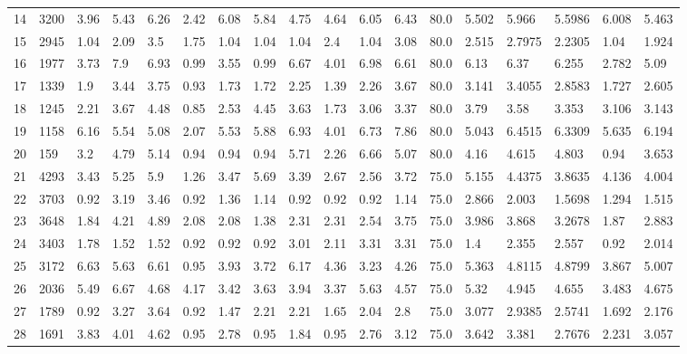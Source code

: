 \documentclass[landscape, 10pt]{report}
\begin{document}
\begin{longtable}{l || l || l | l | l | l | l | l | l | l | l | l | l || l | l | l | l | l}
14 & 3200 & 3.96 & 5.43 & 6.26 & 2.42 & 6.08 & 5.84 & 4.75 & 4.64 & 6.05 & 6.43 & 80.0 & 5.502 & 5.966 & 5.5986 & 6.008 & 5.463\\ 
\rowcolor{lightgray}15 & 2945 & 1.04 & 2.09 & 3.5 & 1.75 & 1.04 & 1.04 & 1.04 & 2.4 & 1.04 & 3.08 & 80.0 & 2.515 & 2.7975 & 2.2305 & 1.04 & 1.924\\ 
16 & 1977 & 3.73 & 7.9 & 6.93 & 0.99 & 3.55 & 0.99 & 6.67 & 4.01 & 6.98 & 6.61 & 80.0 & 6.13 & 6.37 & 6.255 & 2.782 & 5.09\\ 
\rowcolor{lightgray}17 & 1339 & 1.9 & 3.44 & 3.75 & 0.93 & 1.73 & 1.72 & 2.25 & 1.39 & 2.26 & 3.67 & 80.0 & 3.141 & 3.4055 & 2.8583 & 1.727 & 2.605\\ 
18 & 1245 & 2.21 & 3.67 & 4.48 & 0.85 & 2.53 & 4.45 & 3.63 & 1.73 & 3.06 & 3.37 & 80.0 & 3.79 & 3.58 & 3.353 & 3.106 & 3.143\\ 
\rowcolor{lightgray}19 & 1158 & 6.16 & 5.54 & 5.08 & 2.07 & 5.53 & 5.88 & 6.93 & 4.01 & 6.73 & 7.86 & 80.0 & 5.043 & 6.4515 & 6.3309 & 5.635 & 6.194\\ 
20 & 159 & 3.2 & 4.79 & 5.14 & 0.94 & 0.94 & 0.94 & 5.71 & 2.26 & 6.66 & 5.07 & 80.0 & 4.16 & 4.615 & 4.803 & 0.94 & 3.653\\ 
\rowcolor{lightgray}21 & 4293 & 3.43 & 5.25 & 5.9 & 1.26 & 3.47 & 5.69 & 3.39 & 2.67 & 2.56 & 3.72 & 75.0 & 5.155 & 4.4375 & 3.8635 & 4.136 & 4.004\\ 
22 & 3703 & 0.92 & 3.19 & 3.46 & 0.92 & 1.36 & 1.14 & 0.92 & 0.92 & 0.92 & 1.14 & 75.0 & 2.866 & 2.003 & 1.5698 & 1.294 & 1.515\\ 
\rowcolor{lightgray}23 & 3648 & 1.84 & 4.21 & 4.89 & 2.08 & 2.08 & 1.38 & 2.31 & 2.31 & 2.54 & 3.75 & 75.0 & 3.986 & 3.868 & 3.2678 & 1.87 & 2.883\\ 
24 & 3403 & 1.78 & 1.52 & 1.52 & 0.92 & 0.92 & 0.92 & 3.01 & 2.11 & 3.31 & 3.31 & 75.0 & 1.4 & 2.355 & 2.557 & 0.92 & 2.014\\ 
\rowcolor{lightgray}25 & 3172 & 6.63 & 5.63 & 6.61 & 0.95 & 3.93 & 3.72 & 6.17 & 4.36 & 3.23 & 4.26 & 75.0 & 5.363 & 4.8115 & 4.8799 & 3.867 & 5.007\\ 
26 & 2036 & 5.49 & 6.67 & 4.68 & 4.17 & 3.42 & 3.63 & 3.94 & 3.37 & 5.63 & 4.57 & 75.0 & 5.32 & 4.945 & 4.655 & 3.483 & 4.675\\ 
\rowcolor{lightgray}27 & 1789 & 0.92 & 3.27 & 3.64 & 0.92 & 1.47 & 2.21 & 2.21 & 1.65 & 2.04 & 2.8 & 75.0 & 3.077 & 2.9385 & 2.5741 & 1.692 & 2.176\\ 
28 & 1691 & 3.83 & 4.01 & 4.62 & 0.95 & 2.78 & 0.95 & 1.84 & 0.95 & 2.76 & 3.12 & 75.0 & 3.642 & 3.381 & 2.7676 & 2.231 & 3.057\\ 

\end{longtable}
\end{document}
